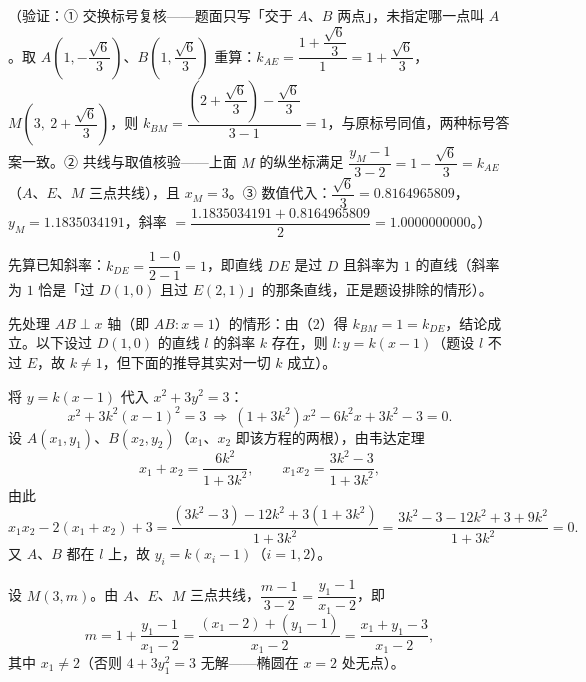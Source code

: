 \begin{answer}
（验证：① 交换标号复核——题面只写「交于 \(A\)、\(B\) 两点」，未指定哪一点叫 \(A\)。取 \(A\left(1,-\dfrac{\sqrt{6}}{3}\right)\)、\(B\left(1,\dfrac{\sqrt{6}}{3}\right)\) 重算：\(k_{AE}=\dfrac{1+\dfrac{\sqrt{6}}{3}}{1}=1+\dfrac{\sqrt{6}}{3}\)，\(M\left(3,\ 2+\dfrac{\sqrt{6}}{3}\right)\)，则 \(k_{BM}=\dfrac{\left(2+\dfrac{\sqrt{6}}{3}\right)-\dfrac{\sqrt{6}}{3}}{3-1}=1\)，与原标号同值，两种标号答案一致。② 共线与取值核验——上面 \(M\) 的纵坐标满足 \(\dfrac{y_{M}-1}{3-2}=1-\dfrac{\sqrt{6}}{3}=k_{AE}\)（\(A\)、\(E\)、\(M\) 三点共线），且 \(x_{M}=3\)。③ 数值代入：\(\dfrac{\sqrt{6}}{3}=0.8164965809\)，\(y_{M}=1.1835034191\)，斜率 \(=\dfrac{1.1835034191+0.8164965809}{2}=1.0000000000\)。）


先算已知斜率：\(k_{DE}=\dfrac{1-0}{2-1}=1\)，即直线 \(DE\) 是过 \(D\) 且斜率为 \(1\) 的直线（斜率为 \(1\) 恰是「过 \(D(1,0)\) 且过 \(E(2,1)\)」的那条直线，正是题设排除的情形）。

先处理 \(AB\perp x\) 轴（即 \(AB:x=1\)）的情形：由（2）得 \(k_{BM}=1=k_{DE}\)，结论成立。以下设过 \(D(1,0)\) 的直线 \(l\) 的斜率 \(k\) 存在，则 \(l:y=k(x-1)\)（题设 \(l\) 不过 \(E\)，故 \(k\neq1\)，但下面的推导其实对一切 \(k\) 成立）。

将 \(y=k(x-1)\) 代入 \(x^{2}+3y^{2}=3\)：
\nopagebreak[4]
\[
x^{2}+3k^{2}(x-1)^{2}=3\ \Longrightarrow\ \left(1+3k^{2}\right)x^{2}-6k^{2}x+3k^{2}-3=0 .
\]
设 \(A(x_{1},y_{1})\)、\(B(x_{2},y_{2})\)（\(x_{1}\)、\(x_{2}\) 即该方程的两根），由韦达定理
\nopagebreak[4]
\[
x_{1}+x_{2}=\frac{6k^{2}}{1+3k^{2}},\qquad x_{1}x_{2}=\frac{3k^{2}-3}{1+3k^{2}},
\]
由此
\nopagebreak[4]
\[
x_{1}x_{2}-2\left(x_{1}+x_{2}\right)+3=\frac{\left(3k^{2}-3\right)-12k^{2}+3\left(1+3k^{2}\right)}{1+3k^{2}}=\frac{3k^{2}-3-12k^{2}+3+9k^{2}}{1+3k^{2}}=0 . \tag{$\ast$}
\]
又 \(A\)、\(B\) 都在 \(l\) 上，故 \(y_{i}=k\left(x_{i}-1\right)\)（\(i=1,2\)）。

设 \(M(3,m)\)。由 \(A\)、\(E\)、\(M\) 三点共线，\(\dfrac{m-1}{3-2}=\dfrac{y_{1}-1}{x_{1}-2}\)，即
\nopagebreak[4]
\[
m=1+\frac{y_{1}-1}{x_{1}-2}=\frac{\left(x_{1}-2\right)+\left(y_{1}-1\right)}{x_{1}-2}=\frac{x_{1}+y_{1}-3}{x_{1}-2},
\]
其中 \(x_{1}\neq2\)（否则 \(4+3y_{1}^{2}=3\) 无解——椭圆在 \(x=2\) 处无点）。


\end{answer}
